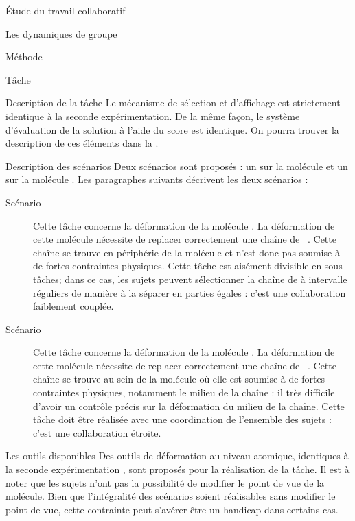 \documentclass[myfrancais]{mythesis}
\begin{document}
\begin{mypart}{Étude du travail collaboratif}
\begin{mychapter}{Les dynamiques de groupe}
\begin{mysection}{Méthode}
\begin{mysubsection}{Tâche}
\begin{mysubsubsection}{Description de la tâche}
						Le mécanisme de sélection et d'affichage est strictement identique à la seconde expérimentation.
						De la même façon, le système d'évaluation de la solution à l'aide du score  est identique.
						On pourra trouver la description de ces éléments dans la .
					\end{mysubsubsection}
					\begin{mysubsubsection}{Description des scénarios}
						Deux scénarios sont proposés : un sur la molécule \myPrion et un sur la molécule \myUbiquitin.
						Les paragraphes suivants décrivent les deux scénarios :
						\begin{description}
							\item[Scénario~]
								Cette tâche concerne la déformation de la molécule \myPrion.
								La déformation de cette molécule nécessite de replacer correctement une chaîne de ~.
								Cette chaîne se trouve en périphérie de la molécule et n'est donc pas soumise à de fortes contraintes physiques.
								Cette tâche est aisément divisible en sous-tâches; dans ce cas, les sujets peuvent sélectionner la chaîne de  à intervalle réguliers de manière à la séparer en parties égales : c'est une collaboration faiblement couplée.
							\item[Scénario~]
								Cette tâche concerne la déformation de la molécule \myUbiquitin.
								La déformation de cette molécule nécessite de replacer correctement une chaîne de ~.
								Cette chaîne se trouve au sein de la molécule où elle est soumise à de fortes contraintes physiques, notamment le milieu de la chaîne : il très difficile d'avoir un contrôle précis sur la déformation du milieu de la chaîne.
								Cette tâche doit être réalisée avec une coordination de l'ensemble des sujets : c'est une collaboration étroite.
						\end{description}
					\end{mysubsubsection}
					\begin{mysubsubsection}{Les outils disponibles}
						Des outils de déformation au niveau atomique, identiques à la seconde expérimentation , sont proposés pour la réalisation de la tâche.
						Il est à noter que les sujets n'ont pas la possibilité de modifier le point de vue de la molécule.
						Bien que l'intégralité des scénarios soient réalisables sans modifier le point de vue, cette contrainte peut s'avérer être un handicap dans certains cas.

\end{mysubsubsection}
\end{mysubsection}
\end{mysection}
\end{mychapter}
\end{mypart}
\end{document}
